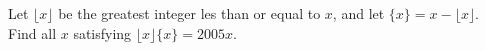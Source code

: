 \documentclass[varwidth]{standalone}
\begin{document}
    Let $\lfloor x \rfloor$ be the greatest integer les than or equal to $x$, and let $\{x\} = x - \lfloor x \rfloor$. Find all $x$ satisfying $\lfloor x \rfloor \{x\} = 2005x$.
\end{document}
